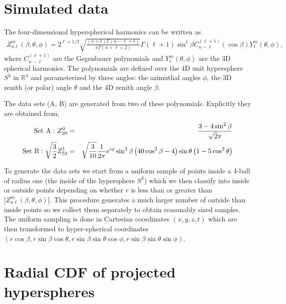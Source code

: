 \appendix

\section{Simulated data}

The  four-dimensional hyperspherical harmonics \cite{Domokos:1967fgx} can be written as
\begin{eqnarray}
Z^m_{n\ell}(\beta,\theta,\phi)=2^{\ell+1/2}\sqrt{\frac{(n+1)\Gamma(n-\ell+1)}{\pi\Gamma(n+\ell+2)}}
\Gamma(\ell+1)\sin^\ell\beta C^{(\ell+1)}_{n-\ell}(\cos\beta)Y^m_\ell(\theta,\phi),
\end{eqnarray}
where $C^{(\ell+1)}_{n-\ell}$ are the Gegenbauer polynomials and $Y^m_\ell(\theta,\phi)$ are the 3D spherical harmonics. The polynomials are defined over the 4D unit hypersphere $S^3$ in $\mathbb{R}^4$ and parameterized by three angles: the azimuthal angles $\phi$, the 3D zenith (or polar) angle $\theta$ and the 4D zenith angle $\beta$. 

The data sets (A, B) are generated from two of these polynomials. Explicitly they are obtained from,
\begin{eqnarray}
{\rm Set~A:}~Z^0_{20} &=& \frac{3-4\sin^2\beta}{\sqrt{2}\pi} \nonumber \\
{\rm Set~B:}~\sqrt{\frac{3}{2}}Z^1_{53} &=& \sqrt{\frac{3}{10}}\frac{1}{2\pi} e^{i\phi}\sin^3\beta\left(40\cos^2\beta-4\right)\sin\theta\left(1-5\cos^2\theta\right)
\end{eqnarray}

To generate the data sets we start from a uniform sample of points inside a 4-ball of radius one (the inside of the hypersphere $S^3$)  which we then classify into inside or outside points depending on whether $r$ is less than or greater than $|Z^m_{n\ell}(\beta,\theta,\phi)|$. This procedure generates a much larger number of outside than inside points so we collect them separately to obtain reasonably sized samples. The uniform sampling is done in Cartesian coordinates $(x,y,z,t)$ which are then transformed to hyper-spherical coordinates  $(r\cos\beta,r\sin\beta\cos\theta,r\sin\beta\sin\theta\cos\phi,r\sin\beta\sin\theta\sin\phi)$.



\section{Radial CDF of projected hyperspheres}

